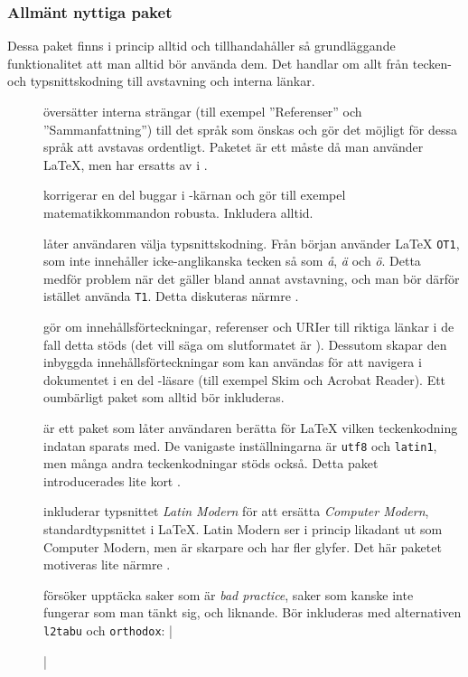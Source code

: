 \documentclass[../../latex.tex]{subfiles}
\begin{document}
\subsubsection{Allmänt nyttiga paket}
Dessa paket finns i princip alltid och tillhandahåller så grundläggande
funktionalitet att man alltid bör använda dem. Det handlar om allt från
tecken- och typsnittskodning till avstavning och interna länkar.

\begin{description}
	\item[]
	översätter interna strängar (till exempel ”Referenser” och 
	”Sammanfattning”) till det språk som önskas och gör det möjligt för
	dessa språk att avstavas ordentligt. Paketet är ett måste då man
	använder \LaTeX, men har ersatts av  i \XeTeX.
	
	\newpage
	\item[]
	korrigerar en del buggar i \LaTeXe-kärnan och gör till 
	exempel matematikkommandon robusta. Inkludera alltid.
	
	\item[]
	låter användaren välja typsnittskodning. Från början använder \LaTeX{}
	\texttt{OT1}, som inte innehåller icke-anglikanska tecken så som
	\emph{å}, \emph{ä} och \emph{ö}. Detta medför problem när det gäller
	bland annat avstavning, och man bör därför istället använda 
	\texttt{T1}. Detta diskuteras närmre .
	
	\item[]
	gör om innehållsförteckningar, referenser och URIer till riktiga
	länkar i de fall detta stöds (det vill säga om slutformatet är \PDF).
	Dessutom skapar den inbyggda innehållsförteckningar som kan användas
	för att navigera i dokumentet i en del \PDF-läsare (till exempel Skim
	och Acrobat Reader).
	Ett oumbärligt paket som alltid bör inkluderas.
	
	\item[]
	är ett paket som låter användaren berätta för \LaTeX{} vilken
	teckenkodning indatan sparats med. De vanigaste inställningarna är
	\texttt{utf8} och \texttt{latin1}, men många andra teckenkodningar
	stöds också.
	Detta paket introducerades lite kort .
	
	\item[]
	inkluderar typsnittet \emph{Latin Modern} för att ersätta
	\emph{Computer Modern}, standardtypsnittet i \LaTeX. Latin Modern ser
	i princip likadant ut som Computer Modern, men är skarpare och har
	fler glyfer. Det här paketet motiveras lite närmre
	.
	
	\item[\emph{}]
	försöker upptäcka saker som är \emph{bad practice}, saker som kanske
	inte fungerar som man tänkt sig, och liknande. Bör inkluderas med
	alternativen \texttt{l2tabu} och \texttt{orthodox}:
	\latex|\usepackage[l2tabu,orthodox]{nag}|
\end{description}
\end{document}
